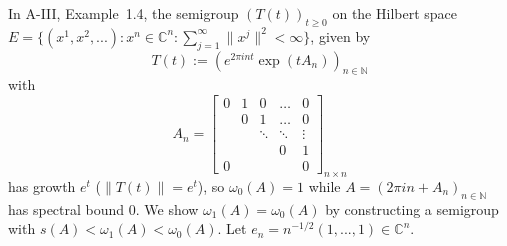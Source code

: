 \begin{example}\label{ex:a4-1.6} 
In A-III, Example~1.4, the semigroup $ (T(t))_{t \geq 0} $ on the Hilbert space $ E = \{(x^1, x^2, ...) \colon x^n \in \mathbb{C}^n\colon\sum_{j=1}^{\infty} \|x^j\|^2 < \infty\} $, given by 
\[\textstyle{
T(t) := (e^{2\pi i n t} \exp(t A_n))_{n \in \mathbb{N}}
}\]
with
\[
A_n =
\begin{bmatrix}
0 & 1 & 0 & \dots & 0 \\
& 0 & 1 & \dots & 0 \\
& & \ddots & \ddots & \vdots \\
& & & 0 & 1 \\
0 & & & & 0
\end{bmatrix}_{n \times n}
\]
has growth $ e^t $ (\ie $ \|T(t)\| = e^t $), so $ \omega_0(A) = 1 $ while $ A = (2\pi i n + A_n)_{n \in \mathbb{N}} $ has spectral bound $ 0 $. 
We show $ \omega_1(A) = \omega_0(A) $ by constructing a semigroup with $ s(A) < \omega_1(A) < \omega_0(A) $. 
Let $ e_n = n^{-1/2} (1, ..., 1) \in \mathbb{C}^n $. 


\end{example}
